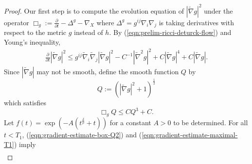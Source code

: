 \documentclass[12pt]{amsart}
\newcommand{\del}{\nabla}
\newcommand{\hdel}{\tilde{\nabla}}
\theoremstyle{remark}
\numberwithin{equation}{section}
\begin{document}
\begin{proof}
    Our first step is to compute the evolution equation of $|\hdel g|^2$ under the operator $\Box_g := \frac{\partial}{\partial t} - \Delta^{g} - \nabla_X$ where $\Delta^g = g^{ij}\del_i\del_j$ is taking derivatives with respect to the metric $g$ instead of $h$. By (\ref{eqn:prelim-ricci-deturck-flow}) and Young's inequality, %
    \begin{align}\label{eqn:gradient-estimate-partialt-norm-hdelg}
        \frac{\partial}{\partial t} |\hdel g|^2 \leq g^{ij}\hdel_i\hdel_j|\hdel g|^2 - C^{-1}|\hdel^2 g|^2 + C |\hdel g|^4 + C|\hdel g|.
    \end{align}
    Since $|\hdel g|$ may not be smooth, define the smooth function $Q$ by
    \begin{equation*}
        Q := \left(|\hdel g|^2 + 1\right)^{\frac{1}{2}}
    \end{equation*}
%    
which satisfies
    \begin{equation}\label{eqn:gradient-estimate-box-Q2}
        \Box_g Q \leq C Q^3 + C.
    \end{equation}
    Let $f(t) = \exp\left(-A(t^{\frac{\delta}{p}} +  t)\right)$ for a constant $A > 0$ to be determined. For all $t < T_1$, (\ref{eqn:gradient-estimate-box-Q2}) and (\ref{eqn:gradient-estimate-maximal-T1}) imply %
    \begin{align}\label{eqn:gradient-estimate-box-Q3}

\end{align}
\end{proof}
\end{document}

